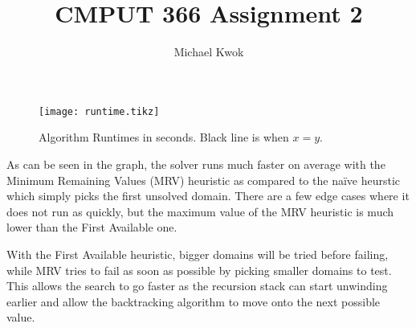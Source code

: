 \documentclass{article}
\title{CMPUT 366 Assignment 2}
\author{Michael Kwok}
\begin{document}
\maketitle
\begin{figure}[h]
  \centering
  \texttt{[image: runtime.tikz]}
  \caption{Algorithm Runtimes in seconds. Black line is when $x=y$.}
\end{figure}

As can be seen in the graph, the solver runs much faster on average with the Minimum Remaining Values (MRV) heuristic as compared to the naïve heurstic which simply picks the first unsolved domain. There are a few edge cases where it does not run as quickly, but the maximum value of the MRV heuristic is much lower than the First Available one.

With the First Available heuristic, bigger domains will be tried before failing, while MRV tries to fail as soon as possible by picking smaller domains to test. This allows the search to go faster as the recursion stack can start unwinding earlier and allow the backtracking algorithm to move onto the next possible value.
\end{document}

